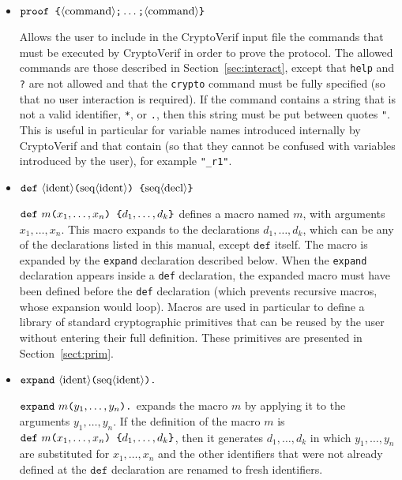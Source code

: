 \begin{itemize}
\begin{itemize}
\end{itemize}

\item $\texttt{proof \{}\langle\textrm{command}\rangle\texttt{;}\ldots \texttt{;}\langle\textrm{command}\rangle \texttt{\}}$

Allows the user to include in the CryptoVerif input file the commands
that must be executed by CryptoVerif in order to prove the protocol.
The allowed commands are those described in Section~\ref{sec:interact},
except that \texttt{help} and \texttt{?} are not allowed and that
the \texttt{crypto} command must be fully specified (so that no user 
interaction is required). If the command contains a string that
is not a valid identifier, \texttt{*}, or \texttt{.}, then this string
must be put between quotes \texttt{"}. This is useful in particular for
variable names introduced internally by CryptoVerif and that contain
\texttt{\string@} (so that they cannot be confused with variables introduced
by the user), for example \texttt{"\_r1"}.

\item ${\tt def\ }\nonterm{ident}\texttt{(}\seq{ident}\texttt{) \{}
\seq{decl}\texttt{\}}$ 

${\tt def\ }m\texttt{(}x_1, \ldots, x_n\texttt{) \{}
d_1, \ldots, d_k\texttt{\}}$ defines a macro named $m$, with arguments
$x_1, \ldots, x_n$. This macro expands to the declarations
$d_1, \ldots, d_k$, which can be any of the declarations listed in
this manual, except $\texttt{def}$ itself.
The macro is expanded by the \texttt{expand} declaration described below.
When the \texttt{expand} declaration appears inside a \texttt{def}
declaration, the expanded macro must have been defined before the
\texttt{def} declaration (which prevents recursive macros, whose
expansion would loop).
Macros are used in particular to define a library of standard
cryptographic primitives that can be reused by the user without
entering their full definition. These primitives are presented
in Section~\ref{sect:prim}.

\item ${\tt expand\ }\nonterm{ident}\texttt{(}\seq{ident}\texttt{).}$

${\tt expand\ }m\texttt{(}y_1, \ldots, y_n\texttt{).}$ expands the macro
$m$ by applying it to the arguments $y_1, \ldots, y_n$. If the definition
of the macro $m$ is ${\tt def\ }m\texttt{(}x_1, \ldots, x_n\texttt{) \{}
d_1, \ldots, d_k\texttt{\}}$, then it generates $d_1, \ldots, d_k$ in which
$y_1, \ldots, y_n$ are substituted for $x_1, \ldots, x_n$ and the other
identifiers that were not already defined at the $\texttt{def}$ declaration
are renamed to fresh identifiers.

\end{itemize}

